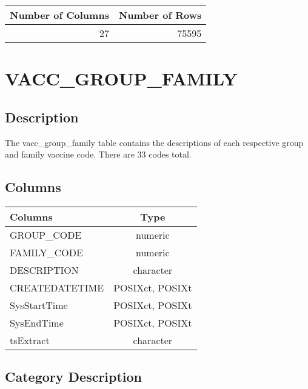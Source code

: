 \documentclass[
  letterpaper,
  DIV=11,
  numbers=noendperiod]{scrreprt}
\begin{document}
\begin{longtable}{rr}
\toprule
Number of Columns & Number of Rows \\ 
\midrule
27 & 75595 \\ 
\bottomrule
\end{longtable}

\hypertarget{vacc_group_family}{%
\chapter*{VACC\_GROUP\_FAMILY}\label{vacc_group_family}}

\hypertarget{description-42}{%
\section*{Description}\label{description-42}}

The vacc\_group\_family table contains the descriptions of each
respective group and family vaccine code. There are 33 codes total.

\hypertarget{columns-42}{%
\section*{Columns}\label{columns-42}}

\begin{longtable}{lc}
\toprule
Columns & Type \\ 
\midrule
GROUP\_CODE & numeric \\ 
FAMILY\_CODE & numeric \\ 
DESCRIPTION & character \\ 
CREATEDATETIME & POSIXct, POSIXt \\ 
SysStartTime & POSIXct, POSIXt \\ 
SysEndTime & POSIXct, POSIXt \\ 
tsExtract & character \\ 
\bottomrule
\end{longtable}

\hypertarget{category-description-42}{%
\section*{Category Description}\label{category-description-42}}
\end{document}
